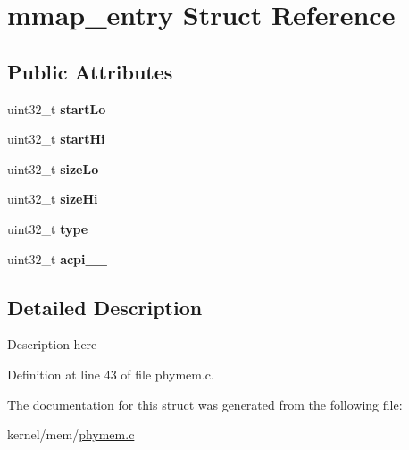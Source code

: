 \hypertarget{structmmap__entry}{}\section{mmap\+\_\+entry Struct Reference}
\label{structmmap__entry}
\subsection*{Public Attributes}
\begin{DoxyCompactItemize}
\item 
\mbox{\label{structmmap__entry_a62eb97bb07eab59234fae05303f18d63}} 
uint32\+\_\+t {\bfseries start\+Lo}
\item 
\mbox{\label{structmmap__entry_afb4a86a7da5f6022cc14994e43aa083e}} 
uint32\+\_\+t {\bfseries start\+Hi}
\item 
\mbox{\label{structmmap__entry_ab1fe8c88b8cd1bc1dd00f5b9b9a325a9}} 
uint32\+\_\+t {\bfseries size\+Lo}
\item 
\mbox{\label{structmmap__entry_a0e16f9815dd4269b52eaa0da6c34db5b}} 
uint32\+\_\+t {\bfseries size\+Hi}
\item 
\mbox{\label{structmmap__entry_acafc50559684f83f69daa642d34b4576}} 
uint32\+\_\+t {\bfseries type}
\item 
\mbox{\label{structmmap__entry_a95e289196d4ec6988b2d8a908562d603}} 
uint32\+\_\+t {\bfseries acpi\+\_\+\_}
\end{DoxyCompactItemize}


\subsection{Detailed Description}
Description here 

Definition at line 43 of file phymem.\+c.



The documentation for this struct was generated from the following file\+:\begin{DoxyCompactItemize}
\item 
kernel/mem/\hyperlink{phymem_8c}{phymem.\+c}\end{DoxyCompactItemize}
